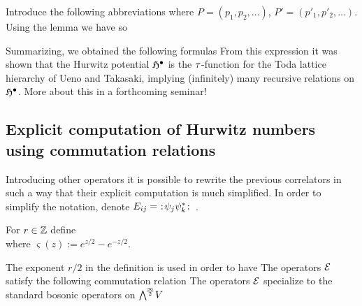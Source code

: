 \documentclass[10pt]{beamer}
\begin{document}
\begin{frame}
Introduce the following abbreviations
where $P=(p_1,p_2,\ldots)$, $P'=(p'_1,p'_2,\ldots)$. 
Using the lemma we have
so

\end{frame}

\begin{frame}

Summarizing, we obtained the following formulas
From this expression it was shown that the Hurwitz potential $\mathfrak H^\bullet$ is the $\tau$-function for the Toda lattice hierarchy of Ueno and Takasaki, implying (infinitely) many recursive relations on $\mathfrak H^\bullet$. More about this in a forthcoming seminar!
\end{frame}

\subsection{Explicit computation of Hurwitz numbers using commutation relations}

\begin{frame}

Introducing other operators it is possible to rewrite the previous correlators in such a way that their explicit computation is much simplified. In order to simplify the notation, denote $E_{ij}=\ :\!{\psi_j\psi_k^*}\!:$\ .

\begin{definition}
	For $r\in\mathbb Z$ define\\[-15pt]
	where $\varsigma(z):=e^{z/2}-e^{-z/2}$.
\end{definition}

The exponent $r/2$ in the definition is used in order to have
The operators $\mathcal E$ satisfy the following commutation relation
The operators $\mathcal E$ specialize to the standard bosonic operators on $\bigwedge^{\!\frac\infty2}\!V$

\end{frame}
\end{document}
